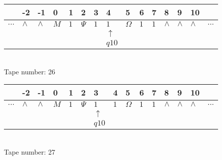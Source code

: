 \documentclass{article}
\begin{document}
\begin{table}[H]
\centering
\begin{tabular}{lllllllllllllll}
 & -2 & -1 & 0 & 1 & 2 & 3 & 4 & 5 & 6 & 7 & 8 & 9 & 10 & \\
\hline
$...$ & \multicolumn{1}{|l|}{$\wedge$} & \multicolumn{1}{|l|}{$\wedge$} & \multicolumn{1}{|l|}{$M$} & \multicolumn{1}{|l|}{$1$} & \multicolumn{1}{|l|}{$\Psi$} & \multicolumn{1}{|l|}{$1$} & \multicolumn{1}{|l|}{$1$} & \multicolumn{1}{|l|}{$\Omega$} & \multicolumn{1}{|l|}{$1$} & \multicolumn{1}{|l|}{$1$} & \multicolumn{1}{|l|}{$\wedge$} & \multicolumn{1}{|l|}{$\wedge$} & \multicolumn{1}{|l|}{$\wedge$} & $...$\\
\hline
&  &  &  &  &  &  & $\uparrow$ &  &  &  &  &  &  &  \\
&  &  &  &  &  &  & $ q10 $ &  &  &  &  &  &  &  \\
\end{tabular}
\\
Tape number: 26
\noindent\makebox[\linewidth]{\hdashrule{\textwidth}{1pt}{1pt}}\end{table}

\begin{table}[H]
\centering
\begin{tabular}{lllllllllllllll}
 & -2 & -1 & 0 & 1 & 2 & 3 & 4 & 5 & 6 & 7 & 8 & 9 & 10 & \\
\hline
$...$ & \multicolumn{1}{|l|}{$\wedge$} & \multicolumn{1}{|l|}{$\wedge$} & \multicolumn{1}{|l|}{$M$} & \multicolumn{1}{|l|}{$1$} & \multicolumn{1}{|l|}{$\Psi$} & \multicolumn{1}{|l|}{$1$} & \multicolumn{1}{|l|}{$1$} & \multicolumn{1}{|l|}{$\Omega$} & \multicolumn{1}{|l|}{$1$} & \multicolumn{1}{|l|}{$1$} & \multicolumn{1}{|l|}{$\wedge$} & \multicolumn{1}{|l|}{$\wedge$} & \multicolumn{1}{|l|}{$\wedge$} & $...$\\
\hline
&  &  &  &  &  & $\uparrow$ &  &  &  &  &  &  &  &  \\
&  &  &  &  &  & $ q10 $ &  &  &  &  &  &  &  &  \\
\end{tabular}
\\
Tape number: 27
\noindent\makebox[\linewidth]{\hdashrule{\textwidth}{1pt}{1pt}}\end{table}
\clearpage
\end{document}
